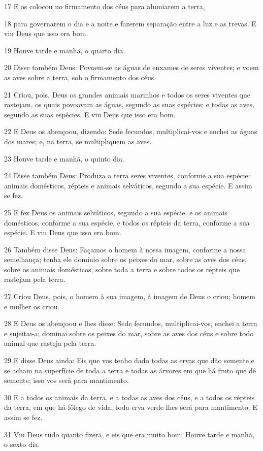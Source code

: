 \par 17 E os colocou no firmamento dos céus para alumiarem a terra,
\par 18 para governarem o dia e a noite e fazerem separação entre a luz e as trevas. E viu Deus que isso era bom.
\par 19 Houve tarde e manhã, o quarto dia.
\par 20 Disse também Deus: Povoem-se as águas de enxames de seres viventes; e voem as aves sobre a terra, sob o firmamento dos céus.
\par 21 Criou, pois, Deus os grandes animais marinhos e todos os seres viventes que rastejam, os quais povoavam as águas, segundo as suas espécies; e todas as aves, segundo as suas espécies. E viu Deus que isso era bom.
\par 22 E Deus os abençoou, dizendo: Sede fecundos, multiplicai-vos e enchei as águas dos mares; e, na terra, se multipliquem as aves.
\par 23 Houve tarde e manhã, o quinto dia.
\par 24 Disse também Deus: Produza a terra seres viventes, conforme a sua espécie: animais domésticos, répteis e animais selváticos, segundo a sua espécie. E assim se fez.
\par 25 E fez Deus os animais selváticos, segundo a sua espécie, e os animais domésticos, conforme a sua espécie, e todos os répteis da terra, conforme a sua espécie. E viu Deus que isso era bom.
\par 26 Também disse Deus: Façamos o homem à nossa imagem, conforme a nossa semelhança; tenha ele domínio sobre os peixes do mar, sobre as aves dos céus, sobre os animais domésticos, sobre toda a terra e sobre todos os répteis que rastejam pela terra.
\par 27 Criou Deus, pois, o homem à sua imagem, à imagem de Deus o criou; homem e mulher os criou.
\par 28 E Deus os abençoou e lhes disse: Sede fecundos, multiplicai-vos, enchei a terra e sujeitai-a; dominai sobre os peixes do mar, sobre as aves dos céus e sobre todo animal que rasteja pela terra.
\par 29 E disse Deus ainda: Eis que vos tenho dado todas as ervas que dão semente e se acham na superfície de toda a terra e todas as árvores em que há fruto que dê semente; isso vos será para mantimento.
\par 30 E a todos os animais da terra, e a todas as aves dos céus, e a todos os répteis da terra, em que há fôlego de vida, toda erva verde lhes será para mantimento. E assim se fez.
\par 31 Viu Deus tudo quanto fizera, e eis que era muito bom. Houve tarde e manhã, o sexto dia.

